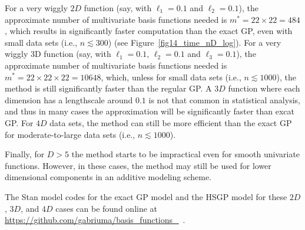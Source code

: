 For a very wiggly $2D$ function (say, with $\ell_1=0.1$ and $\ell_2=0.1$), the approximate number of multivariate basis functions needed is $m^*=22\times 22= 484$, which results in significantly faster computation than the exact GP, even with small data sets (i.e., $n \lesssim 300$) (see Figure~\ref{fig14_time_nD_log}). For a very wiggly $3$D function (say, with $\ell_1=0.1$, $\ell_2=0.1$ and $\ell_3=0.1$), the approximate number of multivariate basis functions needed is $m^*=22\times 22\times 22= 10648$, which, unless for small data sets (i.e., $n \lesssim 1000$), the method is still significantly faster than the regular GP. A $3D$ function where each dimension has a lengthscale around $0.1$ is not that common in statistical analysis, and thus in many cases the approximation will be significantly faster than excat GP. For $4D$ data sets, the method can still be more efficient than the exact GP for moderate-to-large data sets (i.e., $n \lesssim 1000$). 

Finally, for $D>5$ the method starts to be impractical even for smooth univariate functions. However, in these cases, the method may still be used for lower dimensional components in an additive modeling scheme.

The Stan model codes for the exact GP model and the HSGP model for these $2D$, $3D$, and $4D$ cases can be found online at {\small \url{https://github.com/gabriuma/basis_functions_}}  \,.

